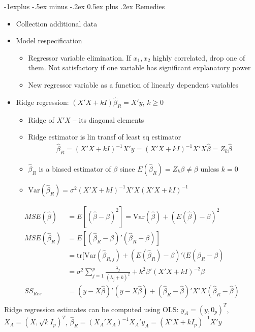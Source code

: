 \documentclass[frenchspacing,9pt,landscape,a4paper]{article}
\makeatletter
\renewcommand{\subsection}{\@startsection{subsection}{2}{0mm}%
                                {-1explus -.5ex minus -.2ex}%
                                {0.5ex plus .2ex}%
                                {\normalfont\normalsize\bfseries}}
\makeatother
\begin{document}
\begin{multicols}{3}
\subsection{Remedies}
\begin{itemize}
	\item Collection additional data
	\item Model respecification
		\begin{itemize}
			\item Regressor variable elimination. If $x_1,x_2$ highly correlated, drop one of them. Not satisfactory if one variable has significant explanatory power
			\item New regressor variable as a function of linearly dependent variables
		\end{itemize}
	\item Ridge regression: $(X'X+kI)\hat{\beta}_R=X'y$,  $k\geq 0$ 
		\begin{itemize}
			\item Ridge of $X'X$ -- its diagonal elements
			\item  Ridge estimator is lin transf of least sq estimator
				\begin{align*}
					\hat{\beta}_R=(X'X+kI)^{-1}X'y=(X'X+kI)^{-1}X'X\hat{\beta}=Z_k\hat{\beta}
				\end{align*}
			\item $\hat{\beta}_R$ is a biased estimator of  $\beta$ since  $E(\hat{\beta}_R)=Z_k\beta\neq\beta$ unless  $k=0$
			\item  $\text{Var}(\hat{\beta}_R)=\sigma^2(X'X+kI)^{-1}X'X(X'X+kI)^{-1}$
		\end{itemize}
\end{itemize}
\begin{align*}
	MSE(\hat{\beta})&=E[(\hat{\beta}-\beta)^2]=\text{Var}(\hat{\beta})+(E(\hat{\beta})-\beta)^2\\
	MSE(\hat{\beta}_R)&=E[(\hat{\beta}_R-\beta)'(\hat{\beta}_R-\beta)]\\
					  &=\text{tr}[\text{Var}(\hat{\beta}_{R,j})+(E(\hat{\beta}_R)-\beta)'(E(\hat{\beta}_R-\beta)\\
					  &=\sigma^2\sum_{j=1}^p \frac{\lambda_j}{(\lambda_j+k)^2}+k^2\beta'(X'X+kI)^{-2}\beta\\
	SS_{Res}&=(y-X\hat{\beta})'(y-X\hat{\beta})+(\hat{\beta}_R-\hat{\beta})'X'X(\hat{\beta}_R-\hat{\beta})\\
\end{align*} Ridge regression estimates can be computed using OLS: $y_A=(y,0_p)^T$,  $X_A=(X,\sqrt{k}I_p)^T$,  $\hat{\beta}_R=(X_A'X_A)^{-1}X_A'y_A=(X'X+kI_p)^{-1}X'y$


\end{multicols}
\end{document}
